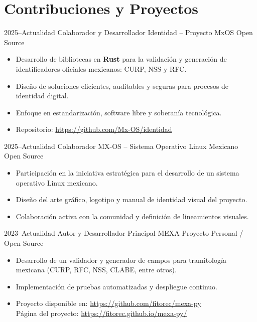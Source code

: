 \section{Contribuciones y Proyectos}

\cventry
{2025--Actualidad}
{Colaborador y Desarrollador}
{Identidad -- Proyecto MxOS}
{Open Source}
{}
{
\begin{itemize}
  \item Desarrollo de bibliotecas en \textbf{Rust} para la validación y generación de identificadores oficiales mexicanos:
  CURP, NSS y RFC.
  \item Diseño de soluciones eficientes, auditables y seguras para procesos de identidad digital.
  \item Enfoque en estandarización, software libre y soberanía tecnológica.
  \item Repositorio: \url{https://github.com/Mx-OS/identidad}
\end{itemize}
}

\cventry
{2025--Actualidad}
{Colaborador}
{MX-OS -- Sistema Operativo Linux Mexicano}
{Open Source}
{}
{
\begin{itemize}
  \item Participación en la iniciativa estratégica para el desarrollo de un sistema operativo Linux mexicano.
  \item Diseño del arte gráfico, logotipo y manual de identidad visual del proyecto.
  \item Colaboración activa con la comunidad y definición de lineamientos visuales.
\end{itemize}
}

\cventry
{2023--Actualidad}
{Autor y Desarrollador Principal}
{MEXA}
{Proyecto Personal / Open Source}
{}
{
\begin{itemize}
  \item Desarrollo de un validador y generador de campos para tramitología mexicana
  (CURP, RFC, NSS, CLABE, entre otros).
  \item Implementación de pruebas automatizadas y despliegue continuo.
  \item Proyecto disponible en:
  \url{https://github.com/fitorec/mexa-py} \\
  Página del proyecto: \url{https://fitorec.github.io/mexa-py/}
\end{itemize}
}

